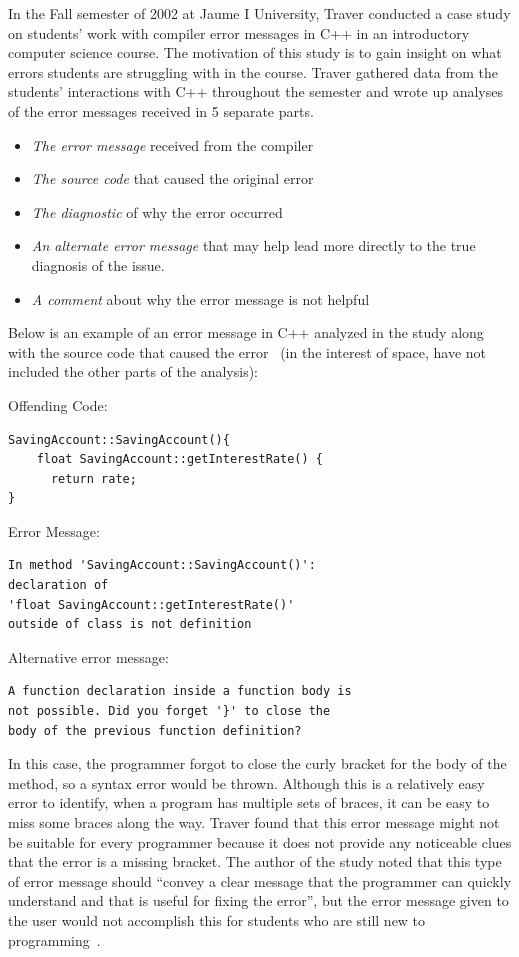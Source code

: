 \documentclass{sig-alternate}
\begin{document}
In the Fall semester of 2002 at Jaume I University, Traver conducted a case study on students' work with compiler error messages in C++ in an introductory computer science course.
The motivation of this study is to gain insight on what errors students are struggling with in the course.
Traver gathered data from the students' interactions with C++ throughout the semester and wrote up analyses of the error messages received in 5 separate parts.
\begin{itemize}
	\item \textit{The error message} received from the compiler
	\item \textit{The source code} that caused the original error
	\item \textit{The diagnostic} of why the error occurred
	\item \textit{An alternate error message} that may help lead more directly to the true diagnosis of the issue.
	\item \textit{A comment} about why the error message is not helpful
\end{itemize}

Below is an example of an error message in C++ analyzed in the study along with the source code that caused the error~\cite{Traver:2010} (in the interest of space,  have not included the other parts of the analysis):

Offending Code:
\begin{verbatim}
SavingAccount::SavingAccount(){
    float SavingAccount::getInterestRate() {
   	  return rate;
}
\end{verbatim}

Error Message:
\begin{verbatim}
In method 'SavingAccount::SavingAccount()':
declaration of 
'float SavingAccount::getInterestRate()'
outside of class is not definition
\end{verbatim}

Alternative error message:
\begin{verbatim}
A function declaration inside a function body is 
not possible. Did you forget '}' to close the 
body of the previous function definition?
\end{verbatim}

In this case, the programmer forgot to close the curly bracket for the body of the method, so a syntax error would be thrown.
Although this is a relatively easy error to identify, when a program has multiple sets of braces, it can be easy to miss some braces along the way.
Traver found that this error message might not be suitable for every programmer because it does not provide any noticeable clues that the error is a missing bracket.
The author of the study noted that this type of error message should ``convey a clear message that the programmer can quickly understand and that is useful for fixing the error'', but the error message given to the user would not accomplish this for students who are still new to programming~\cite{Traver:2010}.
\end{document}
